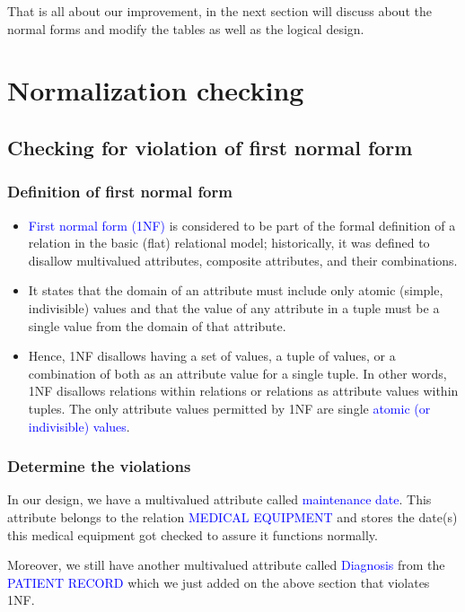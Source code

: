 \documentclass[a4paper]{article}
\numberwithin{equation}{section}
\begin{document}
That is all about our improvement, in the next section will discuss about the normal forms and modify the tables as well as the logical design.
\section{Normalization checking}
\subsection{Checking for violation of first normal form}
\subsubsection{Definition of first normal form }
\begin{itemize}
  \item \textcolor{blue}{First normal form (1NF)} is considered to be part of the formal definition of a relation in the basic (flat) relational model; historically, it was defined to disallow multivalued attributes, composite attributes, and their combinations.
  \item It states that the domain of an attribute must include only atomic (simple, indivisible) values and that the value of any attribute in a tuple must be a single value from the domain of that attribute.
  \item Hence, 1NF disallows having a set of values, a tuple of values, or a combination of both as an attribute value for a single tuple.
        In other words, 1NF disallows relations within relations or relations as attribute values within tuples.
        The only attribute values permitted by 1NF are single \textcolor{blue}{atomic (or indivisible) values}.
\end{itemize}

\subsubsection{Determine the violations}
In our design, we have a multivalued attribute called \textcolor{blue}{maintenance date}.
This attribute belongs to the relation \textcolor{blue}{MEDICAL EQUIPMENT} and stores the date(s) this medical equipment got checked to assure it functions normally.

Moreover, we still have another multivalued attribute called \textcolor{blue}{Diagnosis} from the \textcolor{blue}{PATIENT RECORD} which we just added on the above section that violates 1NF\@.
\end{document}
